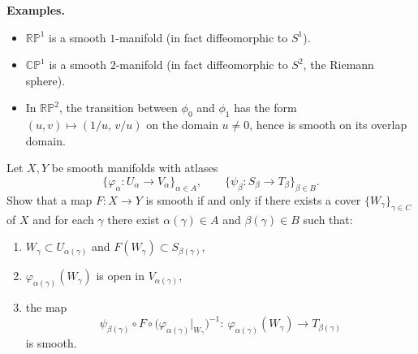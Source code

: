\begin{solution}
\medskip
\noindent\textbf{Examples.}
\begin{itemize}
	\item $\mathbb{RP}^1$ is a smooth $1$-manifold (in fact diffeomorphic to $S^1$).
	\item $\mathbb{CP}^1$ is a smooth $2$-manifold (in fact diffeomorphic to $S^2$, the Riemann sphere).
	\item In $\mathbb{RP}^2$, the transition between $\phi_0$ and $\phi_1$ has the form $(u,v)\mapsto (1/u,\,v/u)$ on the domain $u\neq 0$,
	hence is smooth on its overlap domain.
\end{itemize}



\end{solution}

\begin{problem}
\label{prob:cp-vii-0007}
Let $X,Y$ be smooth manifolds with atlases
\[
\{\varphi_\alpha:U_\alpha\to V_\alpha\}_{\alpha\in A},
\qquad
\{\psi_\beta:S_\beta\to T_\beta\}_{\beta\in B}.
\]
Show that a map $F:X\to Y$ is smooth if and only if there exists a cover $\{W_\gamma\}_{\gamma\in C}$ of $X$ and
for each $\gamma$ there exist $\alpha(\gamma)\in A$ and $\beta(\gamma)\in B$ such that:
\begin{enumerate}
	\item[(a)] $W_\gamma\subset U_{\alpha(\gamma)}$ and $F(W_\gamma)\subset S_{\beta(\gamma)}$,
	\item[(b)] $\varphi_{\alpha(\gamma)}(W_\gamma)$ is open in $V_{\alpha(\gamma)}$,
	\item[(c)] the map
	\[
	\psi_{\beta(\gamma)}\circ F\circ \big(\varphi_{\alpha(\gamma)}\vert_{W_\gamma}\big)^{-1}
	:\ \varphi_{\alpha(\gamma)}(W_\gamma)\longrightarrow T_{\beta(\gamma)}
	\]
	is smooth.
\end{enumerate}

\medskip
\end{problem}

